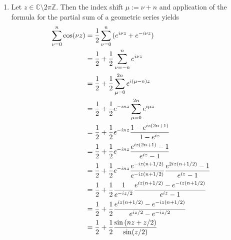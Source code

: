 \begin{enumerate}[label = \textbf{Exercise \arabic*.},wide = 0pt, itemsep=1.5ex]
\begin{enumerate}[label = (\alph*),wide = 0pt, itemsep=1.5ex]
		\item Let $z \in \mathbb{C} \setminus 2\pi \mathbb{Z}$. Then the index shift $\mu := \nu + n$ and application of the formula for the partial sum of a geometric series yields
			\begin{align*}
				\sum_{\nu = 0}^n \cos(\nu z) &= \frac{1}{2}\sum_{\nu = 0}^n \del[0]{e^{i\nu z} + e^{-i\nu z}}\\
				&= \frac{1}{2} + \frac{1}{2}\sum_{\nu = -n}^n e^{i\nu z}\\
				&= \frac{1}{2} + \frac{1}{2}\sum_{\mu = 0}^{2n} e^{i(\mu - n)z}\\
				&= \frac{1}{2} + \frac{1}{2}e^{-inz}\sum_{\mu = 0}^{2n} e^{i\mu z}\\
				&= \frac{1}{2} + \frac{1}{2}e^{-inz}\frac{1 - e^{iz(2n + 1)}}{1 - e^{iz}}\\
				&= \frac{1}{2} + \frac{1}{2}e^{-inz}\frac{e^{iz(2n + 1)}- 1}{e^{iz} - 1}\\
				&= \frac{1}{2} + \frac{1}{2}e^{-inz}\frac{e^{-iz(n + 1/2)}}{e^{-iz(n + 1/2)}}\frac{e^{2iz(n + 1/2)}- 1}{e^{iz} - 1}\\
				&= \frac{1}{2} + \frac{1}{2}\frac{1}{e^{-iz/2}}\frac{e^{iz(n + 1/2)}- e^{-iz(n + 1/2)}}{e^{iz} - 1}\\
				&= \frac{1}{2} + \frac{1}{2}\frac{e^{iz(n + 1/2)}- e^{-iz(n + 1/2)}}{e^{iz/2} - e^{-iz/2}}\\
				&= \frac{1}{2} + \frac{1}{2} \frac{\sin\del[0]{nz + z/2}}{\sin(z/2)}
			\end{align*}
	\end{enumerate}
\end{enumerate}
\printbibliography

